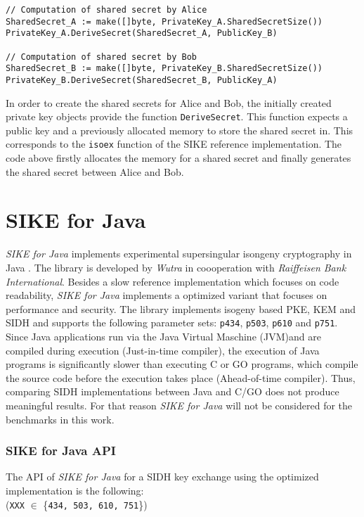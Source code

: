 \begin{lstlisting}[]
// Computation of shared secret by Alice
SharedSecret_A := make([]byte, PrivateKey_A.SharedSecretSize())
PrivateKey_A.DeriveSecret(SharedSecret_A, PublicKey_B)

// Computation of shared secret by Bob
SharedSecret_B := make([]byte, PrivateKey_B.SharedSecretSize())
PrivateKey_B.DeriveSecret(SharedSecret_B, PublicKey_A)
\end{lstlisting}
In order to create the shared secrets for Alice and Bob, the initially created private key objects provide the function \texttt{DeriveSecret}. This function expects a public key and a previously allocated memory to store the shared secret in. This corresponds to the \texttt{isoex} function of the SIKE reference implementation.
The code above firstly allocates the memory for a shared secret and finally generates the shared secret between Alice and Bob.

\section{SIKE for Java}
\textit{SIKE for Java} implements experimental supersingular isongeny cryptography in Java \parencite{SikeForJava2020github}. The library is developed by \textit{Wutra} in coooperation with \textit{Raiffeisen Bank International}. Besides a slow reference implementation which focuses on code readability, \textit{SIKE for Java} implements a optimized variant that focuses on performance and security. The library implements isogeny based \gls{PKE}, \gls{KEM} and \gls{SIDH} and supports the following parameter sets: \texttt{p434}, \texttt{p503}, \texttt{p610} and \texttt{p751}.\\
Since Java applications run via the Java Virtual Maschine (\gls{JVM})and are compiled during execution (Just-in-time compiler), the execution of Java programs is significantly slower than  executing C or GO programs, which compile the source code before the execution takes place (Ahead-of-time compiler). Thus, comparing SIDH implementations between Java and C/GO does not produce meaningful results. For that reason \textit{SIKE for Java} will not be considered for the benchmarks in this work.

\subsubsection{SIKE for Java API}

The API of \textit{SIKE for Java} for a \gls{SIDH} key exchange using the optimized implementation is the following:\\
(\texttt{XXX} $\in$ \{\texttt{434, 503, 610, 751}\})

